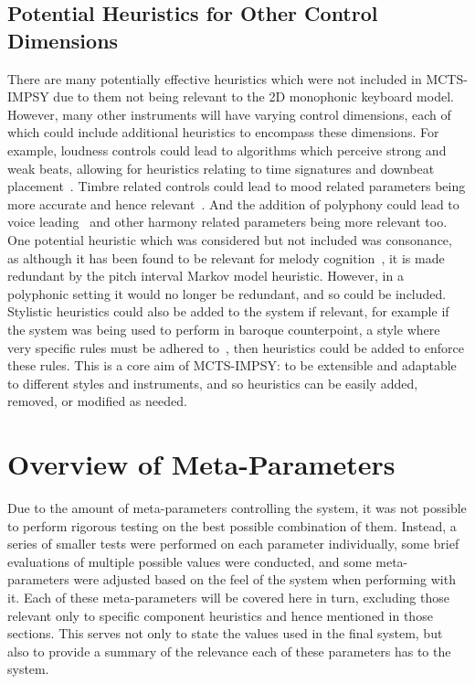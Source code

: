 \subsection{Potential Heuristics for Other Control Dimensions}
There are many potentially effective heuristics which were not included in MCTS-IMPSY due to them not being relevant to the 2D monophonic keyboard model. However, many other instruments will have varying control dimensions, each of which could include additional heuristics to encompass these dimensions. For example, loudness controls could lead to algorithms which perceive strong and weak beats, allowing for heuristics relating to time signatures and downbeat placement~\citep{Laroche2001TempoEstimation}. Timbre related controls could lead to mood related parameters being more accurate and hence relevant~\citep{Hailstone2009TimbreMood}. And the addition of polyphony could lead to voice leading~\citep{Wall2020VoiceLeading} and other harmony related parameters being more relevant too. One potential heuristic which was considered but not included was consonance, as although it has been found to be relevant for melody cognition~\citep{Ahlback2004MelodyCognition}, it is made redundant by the pitch interval Markov model heuristic. However, in a polyphonic setting it would no longer be redundant, and so could be included. Stylistic heuristics could also be added to the system if relevant, for example if the system was being used to perform in baroque counterpoint, a style where very specific rules must be adhered to~\citep{Gauldin2013BaroqueCounterpoint}, then heuristics could be added to enforce these rules. This is a core aim of MCTS-IMPSY: to be extensible and adaptable to different styles and instruments, and so heuristics can be easily added, removed, or modified as needed.

\section{Overview of Meta-Parameters}

Due to the amount of meta-parameters controlling the system, it was not possible to perform rigorous testing on the best possible combination of them. Instead, a series of smaller tests were performed on each parameter individually, some brief evaluations of multiple possible values were conducted, and some meta-parameters were adjusted based on the feel of the system when performing with it. Each of these meta-parameters will be covered here in turn, excluding those relevant only to specific component heuristics and hence mentioned in those sections. This serves not only to state the values used in the final system, but also to provide a summary of the relevance each of these parameters has to the system.

